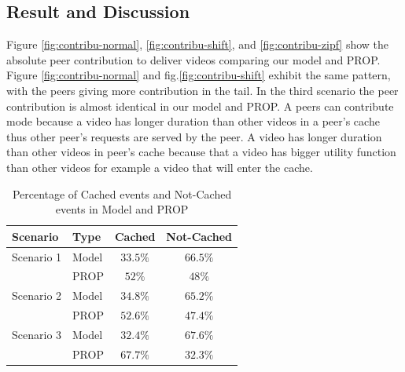 \documentclass[10pt,final,journal,a4paper]{IEEEtran}
\begin{document}
\subsection{Result and Discussion}\label{resultanddiscussion}
Figure \ref{fig:contribu-normal}, \ref{fig:contribu-shift}, and \ref{fig:contribu-zipf} show the absolute peer contribution to deliver videos comparing our model and PROP. 
Figure \ref{fig:contribu-normal} and fig.\ref{fig:contribu-shift} exhibit the same pattern, with
the peers giving more contribution in the tail.
In the third scenario the peer contribution is almost identical in our model and PROP. 
A peers can contribute mode because a video has longer duration than other videos in a peer's cache thus other peer's requests are served by the peer. 
A video has longer duration than other videos in peer's cache because that a video has bigger utility function than other videos for example a video that will enter the cache. 

\begin{table}[!t]
\caption{Percentage of Cached events and Not-Cached events in Model and PROP}
\label{tab:stacked1}
\centering
\begin{tabular}{|l|l|c|c|}
\hline
Scenario & Type & Cached & Not-Cached\\
\hline
Scenario 1 & Model & $33.5\%$ & $66.5\%$ \\
\hline
 & PROP & $52\%$ & $48\%$  \\
\hline

Scenario 2 & Model & $34.8\%$ & $65.2\%$ \\
\hline
 & PROP & $52.6\%$ & $47.4\%$  \\
\hline

Scenario 3 & Model & $32.4\%$ & $67.6\%$  \\
\hline
 & PROP & $67.7\%$ & $32.3\%$ \\
\hline
\end{tabular}
\end{table}
\end{document}
